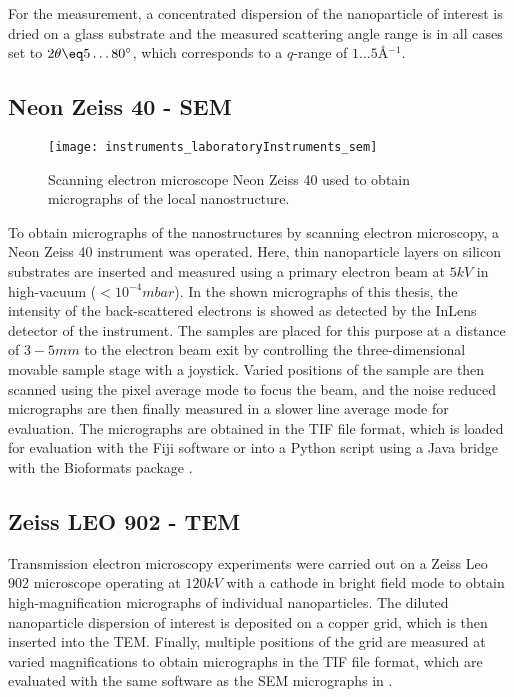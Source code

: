 \documentclass[\main/dresen_thesis.tex]{subfiles}
\begin{document}
    For the measurement, a concentrated dispersion of the nanoparticle of interest is dried on a glass substrate and the measured scattering angle range is in all cases set to $2 \theta \eq 5 \ldots 80^\circ$, which corresponds to a $q$-range of $1 \ldots 5 \unit{\angstrom^{-1}}$.


  \subsection{Neon Zeiss 40 - SEM}
    \label{ch:instruments:laboratoryInstruments:sem}
    \begin{figure}[ht]
      \centering
      \texttt{[image: instruments\_laboratoryInstruments\_sem]}
      \caption{\label{fig:appendix:instruments:sem}Scanning electron microscope Neon Zeiss 40 used to obtain micrographs of the local nanostructure.}
    \end{figure}
    To obtain micrographs of the nanostructures by scanning electron microscopy, a Neon Zeiss 40 instrument was operated.
    Here, thin nanoparticle layers on silicon substrates are inserted and measured using a primary electron beam at $5 \unit{kV}$ in high-vacuum ($< 10^{-4} \unit{mbar}$).
    In the shown micrographs of this thesis, the intensity of the back-scattered electrons is showed as detected by the InLens detector of the instrument.
    The samples are placed for this purpose at a distance of $3 - 5 \unit{mm}$ to the electron beam exit by controlling the three-dimensional movable sample stage with a joystick.
    Varied positions of the sample are then scanned using the pixel average mode to focus the beam, and the noise reduced micrographs are then finally measured in a slower line average mode for evaluation.
    The micrographs are obtained in the TIF file format, which is loaded for evaluation with the Fiji software \cite{Schindelin_2012_Fijia} or into a Python script using a Java bridge with the Bioformats package \cite{Linkert_2010_Metad}.

  \subsection{Zeiss LEO 902 - TEM}
    \label{ch:instruments:laboratoryInstruments:tem}
    Transmission electron microscopy experiments were carried out on a Zeiss Leo 902 microscope operating at $120 \unit{kV}$ with a  cathode in bright field mode to obtain high-magnification micrographs of individual nanoparticles.
    The diluted nanoparticle dispersion of interest is deposited on a copper grid, which is then inserted into the TEM.
    Finally, multiple positions of the grid are measured at varied magnifications to obtain micrographs in the TIF file format, which are evaluated with the same software as the SEM micrographs in .
\end{document}
